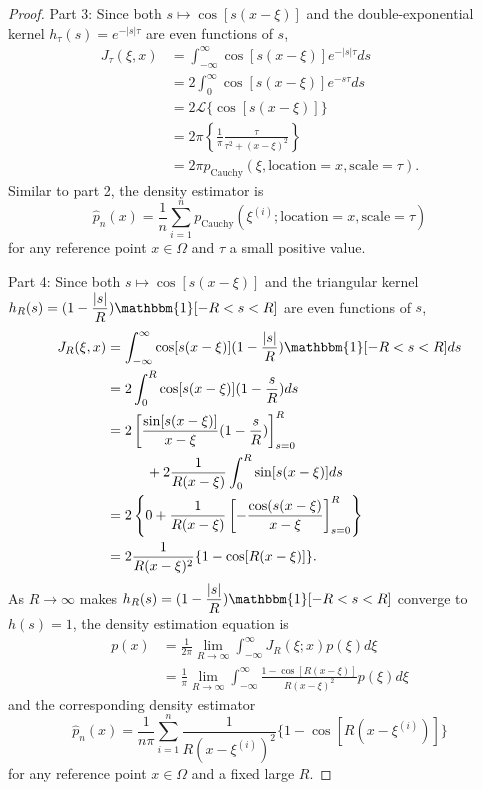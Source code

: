 \documentclass[%
 reprint,
 amsmath,amssymb,
 aps,
]{revtex4-2}
\begin{document}
\begin{proof}
    Part 3: Since both $s \mapsto \cos[s(x - \xi)]$ and the double-exponential kernel $h_\tau(s) = e^{-|s|\tau}$ are even functions of $s$,
    \begin{align*}
        J_\tau(\xi, x) & = \int_{-\infty}^\infty \cos[s(x - \xi)]e^{-|s|\tau}ds \\
        & = 2\int_0^\infty \cos[s(x - \xi)]e^{-s\tau}ds \\
        & = 2 \mathcal{L}\{\cos[s(x - \xi)]\} \\
        & = 2\pi \left\{\frac{1}{\pi}\frac{\tau}{\tau^2 + (x - \xi)^2}\right\} \\
        & = 2\pi p_\text{Cauchy}(\xi, \text{location} = x, \text{scale} = \tau).
    \end{align*}
    Similar to part 2, the density estimator is
    \begin{equation*}
        \hat{p}_n(x) = \frac{1}{n} \sum_{i = 1}^n p_\text{Cauchy}(\xi^{(i)}; \text{location} = x, \text{scale} = \tau)
    \end{equation*}
    for any reference point $x \in \Omega$ and $\tau$ a small positive value.

    Part 4: Since both $s \mapsto \cos[s(x - \xi)]$ and the triangular kernel $\displaystyle h_R(s) = (1 - \frac{|s|}{R}) \mathbbm{1}[-R < s < R]$ are even functions of $s$,
    \begin{align*}
        J_R(\xi, x) & = \int_{-\infty}^\infty \cos[s(x - \xi)](1 - \frac{|s|}{R}) \mathbbm{1}[-R < s < R]ds \\
        & = 2 \int_0^R \cos[s(x - \xi)](1 - \frac{s}{R}) ds \\
        & = 2\left[\frac{\sin[s(x - \xi)]}{x - \xi}(1 - \frac{s}{R}) \right]^R_{s = 0} \\
        & \hspace{1cm} + 2\frac{1}{R(x - \xi)}\int_0^R \sin[s(x - \xi)]ds \\
        & = 2\left\{0+\frac{1}{R(x - \xi)} \left[-\frac{\cos(s(x - \xi)}{x - \xi} \right]^R_{s = 0} \right\} \\
        & = 2\frac{1}{R(x - \xi)^2}\{1 - \cos[R(x - \xi)]\}.
    \end{align*}
    As $R \to \infty$ makes $\displaystyle h_R(s) = (1 - \frac{|s|}{R}) \mathbbm{1}[-R < s < R]$ converge to $h(s) = 1$, the density estimation equation is
    \begin{align*}
        p(x) & = \frac{1}{2\pi} \lim_{R \to \infty} \int_{-\infty}^\infty J_R(\xi; x) p(\xi)d\xi \\
        & = \frac{1}{\pi} \lim_{R \to \infty} \int_{-\infty}^\infty \frac{1 - \cos[R(x - \xi)]}{R(x - \xi)^2} p(\xi) d\xi
    \end{align*}
    and the corresponding density estimator
    \begin{equation*}
        \hat{p}_n(x) = \frac{1}{n\pi} \sum_{i = 1}^n \frac{1}{R(x - \xi^{(i)})^2}\{1 - \cos[R(x - \xi^{(i)})]\}
    \end{equation*}
    for any reference point $x \in \Omega$ and a fixed large $R$.


\end{proof}
\end{document}
